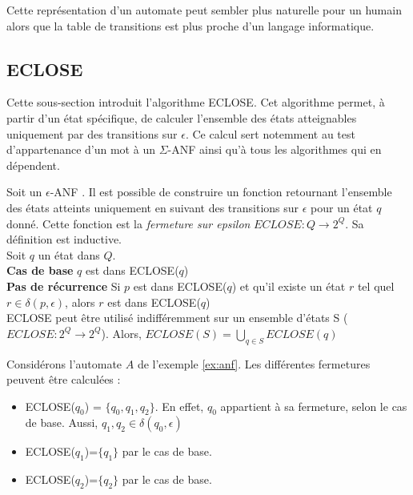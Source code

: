  Cette représentation d'un automate peut sembler plus naturelle pour un humain alors que la table de transitions est plus proche d'un langage informatique.





\subsection{ECLOSE}

Cette sous-section introduit l'algorithme ECLOSE. Cet algorithme permet, à partir d'un état spécifique, de calculer l'ensemble des états atteignables uniquement par des transitions sur $\epsilon$. Ce calcul sert notemment au test d'appartenance d'un mot à un $\Sigma$-ANF ainsi qu'à tous les algorithmes qui en dépendent.

Soit un $\epsilon$-ANF \automaton. Il est possible de construire un fonction retournant l'ensemble des états atteints uniquement en suivant des transitions sur $\epsilon$ pour un état $q$ donné. Cette fonction est la \emph{fermeture sur epsilon} $ECLOSE : Q \rightarrow 2^Q$. Sa définition est inductive.\\

Soit $q$ un état dans $Q$.\\
\textbf{Cas de base} $q$ est dans ECLOSE($q$)\\
\textbf{Pas de récurrence} Si $p$ est dans ECLOSE($q$) et qu'il existe un état $r$ tel quel $r\in\delta(p,\epsilon)$, alors $r$ est dans ECLOSE($q$)\\

ECLOSE peut être utilisé indifféremment sur un ensemble d'états S ($ECLOSE : 2^Q \rightarrow 2^Q$). Alors, $ECLOSE(S)=\bigcup_{q\in S}ECLOSE(q)$

\begin{example}[ECLOSE]\label{ex:anfclosure} Considérons l'automate $A$ de l'exemple \ref{ex:anf}. Les différentes fermetures peuvent être calculées :
	\begin{itemize}
		\item ECLOSE($q_0$) = $\{q_0,q_1,q_2\}$. En effet, $q_0$ appartient à sa fermeture, selon le cas de base. Aussi, $q_1,q_2\in\delta(q_0, \epsilon)$
		\item ECLOSE($q_1$)=$\{q_1\}$ par le cas de base.
		\item ECLOSE($q_2$)=$\{q_2\}$ par le cas de base.
	\end{itemize}
\end{example}


